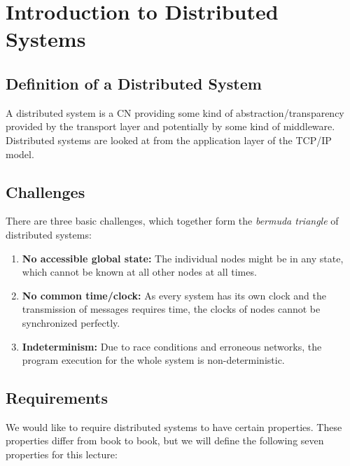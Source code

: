 \section{Introduction to Distributed Systems}

\subsection{Definition of a Distributed System}

A distributed system is a \ac{CN} providing some kind of abstraction/transparency provided by the transport layer and potentially by some kind of middleware. Distributed systems are looked at from the application layer of the TCP/IP model.

\subsection{Challenges}

There are three basic challenges, which together form the \textit{bermuda triangle} of distributed systems:

\begin{enumerate}
    \item \textbf{No accessible global state:} The individual nodes might be in any state, which cannot be known at all other nodes at all times.
    \item \textbf{No common time/clock:} As every system has its own clock and the transmission of messages requires time, the clocks of nodes cannot be synchronized perfectly.
    \item \textbf{Indeterminism:} Due to race conditions and erroneous networks, the program execution for the whole system is non-deterministic.
\end{enumerate}

\subsection{Requirements}

We would like to require distributed systems to have certain properties. These properties differ from book to book, but we will define the following seven properties for this lecture:

